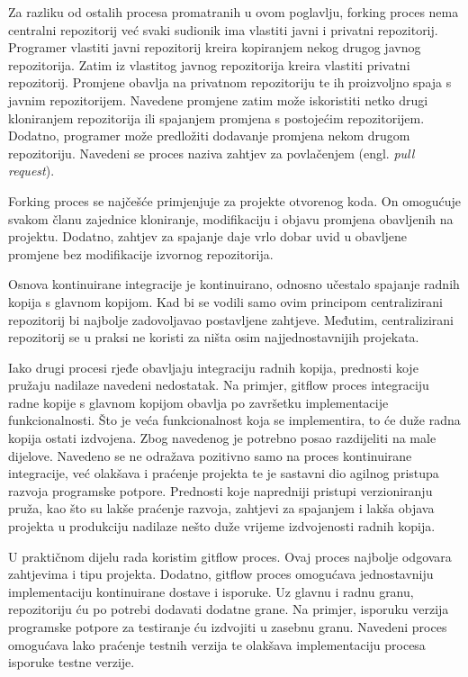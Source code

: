 \documentclass[times, utf8, diplomski, numeric]{fer}
\newcommand{\eng}[1]{(engl. \textit{#1})}
\begin{document}
Za razliku od ostalih procesa promatranih u ovom poglavlju, forking proces nema centralni repozitorij već svaki sudionik ima vlastiti javni i privatni repozitorij. Programer vlastiti javni repozitorij kreira kopiranjem nekog drugog javnog repozitorija. Zatim iz vlastitog javnog repozitorija kreira vlastiti privatni repozitorij. Promjene obavlja na privatnom repozitoriju te ih proizvoljno spaja s javnim repozitorijem. Navedene promjene zatim može iskoristiti netko drugi kloniranjem repozitorija ili spajanjem promjena s postojećim repozitorijem. Dodatno, programer može predložiti dodavanje promjena nekom drugom repozitoriju. Navedeni se proces naziva zahtjev za povlačenjem \eng{pull request}.

Forking proces se najčešće primjenjuje za projekte otvorenog koda. On omogućuje svakom članu zajednice kloniranje, modifikaciju i objavu promjena obavljenih na projektu. Dodatno, zahtjev za spajanje daje vrlo dobar uvid u obavljene promjene bez modifikacije izvornog repozitorija.

Osnova kontinuirane integracije je kontinuirano, odnosno učestalo spajanje radnih kopija s glavnom kopijom. Kad bi se vodili samo ovim principom centralizirani repozitorij bi najbolje zadovoljavao postavljene zahtjeve. Međutim, centralizirani repozitorij se u praksi ne koristi za ništa osim najjednostavnijih projekata.

Iako drugi procesi rjeđe obavljaju integraciju radnih kopija, prednosti koje pružaju nadilaze navedeni nedostatak. Na primjer, gitflow proces integraciju radne kopije s glavnom kopijom obavlja po završetku implementacije funkcionalnosti. Što je veća funkcionalnost koja se implementira, to će duže radna kopija ostati izdvojena. Zbog navedenog je potrebno posao razdijeliti na male dijelove. Navedeno se ne odražava pozitivno samo na proces kontinuirane integracije, već olakšava i praćenje projekta te je sastavni dio agilnog pristupa razvoja programske potpore. Prednosti koje napredniji pristupi verzioniranju pruža, kao što su lakše praćenje razvoja, zahtjevi za spajanjem i lakša objava projekta u produkciju nadilaze nešto duže vrijeme izdvojenosti radnih kopija.

U praktičnom dijelu rada koristim gitflow proces. Ovaj proces najbolje odgovara zahtjevima i tipu projekta. Dodatno, gitflow proces omogućava jednostavniju implementaciju kontinuirane dostave i isporuke. Uz glavnu i radnu granu, repozitoriju ću po potrebi dodavati dodatne grane. Na primjer, isporuku verzija programske potpore za testiranje ću izdvojiti u zasebnu granu. Navedeni proces omogućava lako praćenje testnih verzija te olakšava implementaciju procesa isporuke testne verzije.
\end{document}
